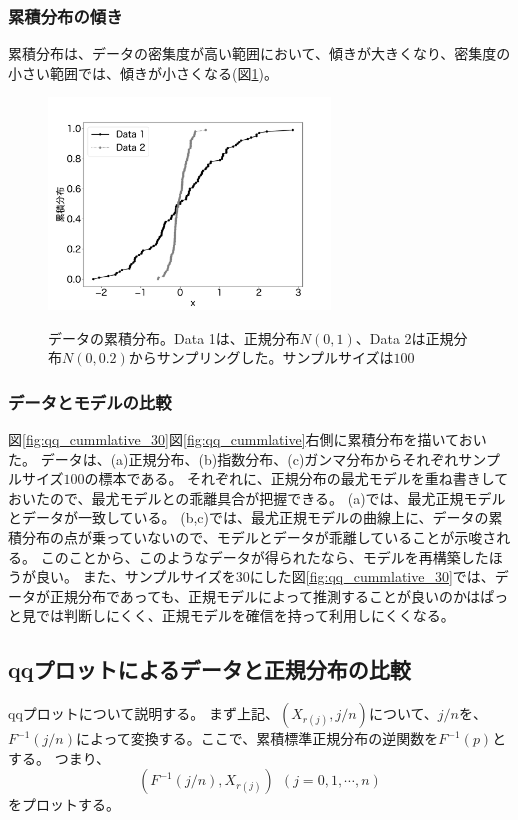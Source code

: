 \subsubsection{累積分布の傾き}
累積分布は、データの密集度が高い範囲において、傾きが大きくなり、密集度の小さい範囲では、傾きが小さくなる(図\ref{fig:qq_ccummlative_data_example_normummlative})。


\begin{figure}
    \begin{center}
        \includegraphics[width=7.5cm]{./image/12_/cummlative_data_example_norm.pdf}
        \label{fig:qq_ccummlative_data_example_normummlative}
        \caption{データの累積分布。Data 1は、正規分布$N(0,1)$、Data 2は正規分布$N(0,0.2)$からサンプリングした。サンプルサイズは$100$}
    \end{center}
\end{figure}


\subsubsection{データとモデルの比較}
図\ref{fig:qq_cummlative_30}図\ref{fig:qq_cummlative}右側に累積分布を描いておいた。
データは、(a)正規分布、(b)指数分布、(c)ガンマ分布からそれぞれサンプルサイズ$100$の標本である。
それぞれに、正規分布の最尤モデルを重ね書きしておいたので、最尤モデルとの乖離具合が把握できる。
(a)では、最尤正規モデルとデータが一致している。
(b,c)では、最尤正規モデルの曲線上に、データの累積分布の点が乗っていないので、モデルとデータが乖離していることが示唆される。
このことから、このようなデータが得られたなら、モデルを再構築したほうが良い。
また、サンプルサイズを30にした図\ref{fig:qq_cummlative_30}では、データが正規分布であっても、正規モデルによって推測することが良いのかはぱっと見では判断しにくく、正規モデルを確信を持って利用しにくくなる。

\subsection{qqプロットによるデータと正規分布の比較}
qqプロットについて説明する。
まず上記、$(X_{r(j)},j/n)$について、$j/n$を、$F^{-1}(j/n)$によって変換する。ここで、累積標準正規分布の逆関数を$F^{-1}(p)$とする。
つまり、
\begin{equation*}
(F^{-1}(j/n),X_{r(j)}) \ \ (j=0,1,\cdots,n)
\end{equation*}
をプロットする。



